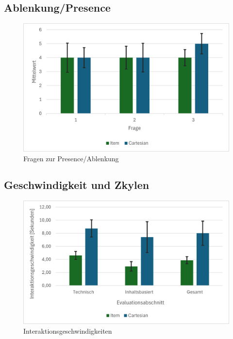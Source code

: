 \subsection{Ablenkung/Presence}

\begin{figure}[tbh]
 \centering
\includegraphics{images/Results/Fragen-zur-Presence-Ablenkung.png}
 \caption{Fragen zur Presence/Ablenkung}
 \label{fig:presence}
\end{figure}

\subsection{Geschwindigkeit und Zkylen}

\begin{figure}[tbh]
 \centering
\includegraphics{images/Results/Interaktionsgeschwindigkeiten.png}
 \caption{Interaktionsgeschwindigkeiten}
 \label{fig:Interaktionsgeschwindigkeiten}
\end{figure}

